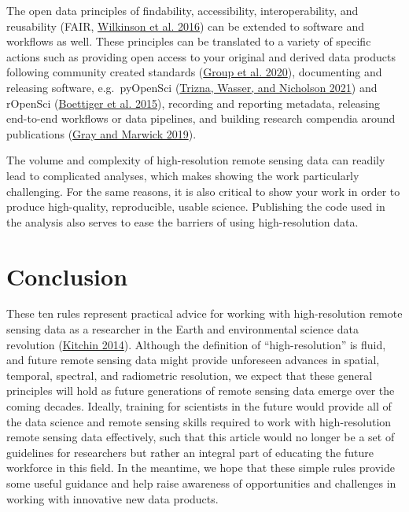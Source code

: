 \documentclass[
  12pt,
]{article}
\begin{document}
The open data principles of findability, accessibility,
interoperability, and reusability (FAIR,
\protect\hyperlink{ref-wilkinson2016fair}{Wilkinson et al. 2016}) can be
extended to software and workflows as well. These principles can be
translated to a variety of specific actions such as providing open
access to your original and derived data products following community
created standards (\protect\hyperlink{ref-rda2020}{Group et al. 2020}),
documenting and releasing software, e.g.~pyOpenSci
(\protect\hyperlink{ref-trizna2021}{Trizna, Wasser, and Nicholson 2021})
and rOpenSci (\protect\hyperlink{ref-boettiger2015building}{Boettiger et
al. 2015}), recording and reporting metadata, releasing end-to-end
workflows or data pipelines, and building research compendia around
publications (\protect\hyperlink{ref-gray2019truth}{Gray and Marwick
2019}).

The volume and complexity of high-resolution remote sensing data can
readily lead to complicated analyses, which makes showing the work
particularly challenging. For the same reasons, it is also critical to
show your work in order to produce high-quality, reproducible, usable
science. Publishing the code used in the analysis also serves to ease
the barriers of using high-resolution data.

\hypertarget{conclusion}{%
\section{Conclusion}\label{conclusion}}

These ten rules represent practical advice for working with
high-resolution remote sensing data as a researcher in the Earth and
environmental science data revolution
(\protect\hyperlink{ref-kitchin2014data}{Kitchin 2014}). Although the
definition of ``high-resolution'' is fluid, and future remote sensing
data might provide unforeseen advances in spatial, temporal, spectral,
and radiometric resolution, we expect that these general principles will
hold as future generations of remote sensing data emerge over the coming
decades. Ideally, training for scientists in the future would provide
all of the data science and remote sensing skills required to work with
high-resolution remote sensing data effectively, such that this article
would no longer be a set of guidelines for researchers but rather an
integral part of educating the future workforce in this field. In the
meantime, we hope that these simple rules provide some useful guidance
and help raise awareness of opportunities and challenges in working with
innovative new data products.
\end{document}
